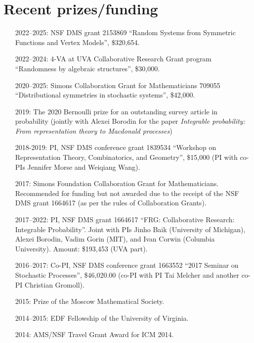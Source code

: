 \documentclass[letterpaper,11pt]{article}
\begin{document}
\section*{Recent prizes/funding}
\begin{itemize}
	\item [2022--2025:]
	NSF DMS grant 2153869 
	``Random Systems from Symmetric Functions and Vertex Models'',
	\$320,654.

	\item [2022--2024:]
	4-VA at UVA Collaborative Research Grant program
	``Randomness by algebraic structures'',
	\$30,000.
	\item [2020--2025:]
		Simons Collaboration Grant for Mathematicians 709055
		``Distributional symmetries in stochastic systems'',
		\$42,000.
	\item [2019:] 
		The 2020 Bernoulli prize for an outstanding survey article in probability 
		(jointly with Alexei Borodin for the paper \emph{Integrable probability: From representation theory to
		Macdonald processes})
	\item 
				[2018-2019:]
				PI, NSF DMS conference grant 
				1839534
				``Workshop on Representation Theory, Combinatorics, and Geometry'',
				\$15,000
				(PI with co-PIs Jennifer Morse and Weiqiang Wang).
	\item
	      [2017:] Simons Foundation Collaboration Grant for
	      Mathematicians. Recommended for funding but not awarded due to
	      the receipt of the NSF DMS grant 1664617 (as per the rules of Collaboration
	      Grants).
	\item
	      [2017--2022:] PI, NSF DMS grant 1664617
	      ``FRG: Collaborative Research: Integrable Probability''.
	      Joint with PIs Jinho Baik (University of Michigan), Alexei
	      Borodin, Vadim Gorin (MIT), and Ivan Corwin (Columbia University). Amount:
	      \$193,453 (UVA part).
	\item
	      [2016--2017:]
	      Co-PI, NSF DMS conference grant 1663552 ``2017 Seminar on Stochastic
	      Processes'', \$46,020.00 (co-PI with PI Tai Melcher and another co-PI
	      Christian Gromoll).
	\item
	      [2015:] Prize of the Moscow Mathematical Society.
	\item
	      [2014--2015:] EDF Fellowship of the University of Virginia.
	\item
	      [2014:] AMS/NSF Travel Grant Award for ICM 2014.

\end{itemize}
\end{document}
